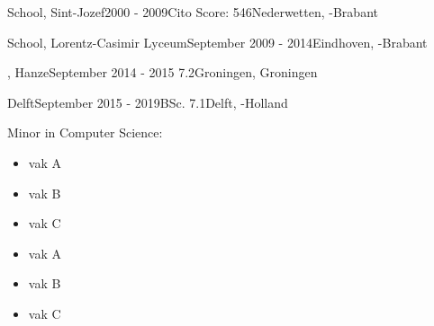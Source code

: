 \begin{rSection}{}
  \begin{experienceItem}
    { School, Sint-Jozef}{2000 - 2009}{Cito Score: 546}{Nederwetten, -Brabant}
  \end{experienceItem}

  \begin{experienceItem}
    { School, Lorentz-Casimir Lyceum}{September 2009 -  2014}{}{Eindhoven, -Brabant}
  \end{experienceItem}

  \begin{experienceItem}
    {, Hanze}{September 2014 -  2015} { 7.2}{Groningen, Groningen}
  \end{experienceItem}

  \begin{experienceItem}
    { Delft}{September 2015 -  2019}{BSc.  7.1}{Delft, -Holland}
  \end{experienceItem}
  \begin{experienceItem}
    {}{}{ Minor in Computer Science:}{}
  \end{experienceItem}

  \vspace{-0.1cm}
  \begin{minipage}{0.4\textwidth}
  \begin{itemize}
    \item vak A\\[-3ex]
    \item vak B\\[-3ex]
    \item vak C\\[-3ex]
  \end{itemize}
  \end{minipage}
  \begin{minipage}{0.4\textwidth}
  \begin{itemize}
    \item vak A\\[-3ex]
    \item vak B\\[-3ex]
    \item vak C\\[-3ex]
  \end{itemize}
  \end{minipage}


\end{rSection}
